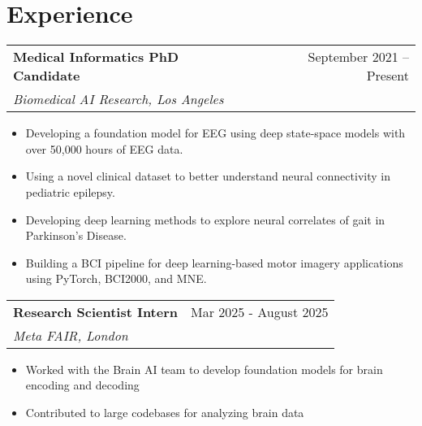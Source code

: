 
\newenvironment{jobshort}[4]{%
  \begin{tabularx}{\linewidth}{@{}X r@{}}
    \textbf{#1} & #4 \\[-1pt]
    \textit{#2, #3} & \\[3pt]
  \end{tabularx}
}{}

\newenvironment{joblong}[4]{%
  \begin{tabularx}{\linewidth}{@{}X r@{}}
    \textbf{#1} & #4 \\[-1pt]
    \textit{#2, #3} & \\[3pt]
  \end{tabularx}
  \begin{itemize}[leftmargin=1em, label=--,topsep=2pt, partopsep=3pt, parsep=0pt, itemsep=2pt]
}{%
  \end{itemize}
  \vspace{0.6em} %
}


\section*{Experience}

\begin{joblong}{Medical Informatics PhD Candidate}{Biomedical AI Research}{Los Angeles}{September 2021 -- Present}
    \item Developing a foundation model for EEG using deep state-space models with over 50,000 hours of EEG data.
    \item Using a novel clinical dataset to better understand neural connectivity in pediatric epilepsy.
    \item Developing deep learning methods to explore neural correlates of gait in Parkinson’s Disease.
    \item Building a BCI pipeline for deep learning-based motor imagery applications using PyTorch, BCI2000, and MNE.
\end{joblong}

\begin{joblong}{Research Scientist Intern}{Meta FAIR}{London}{Mar 2025 - August 2025}
\item Worked with the Brain AI team to develop foundation models for brain encoding and decoding
\item Contributed to large codebases for analyzing brain data
\end{joblong}




